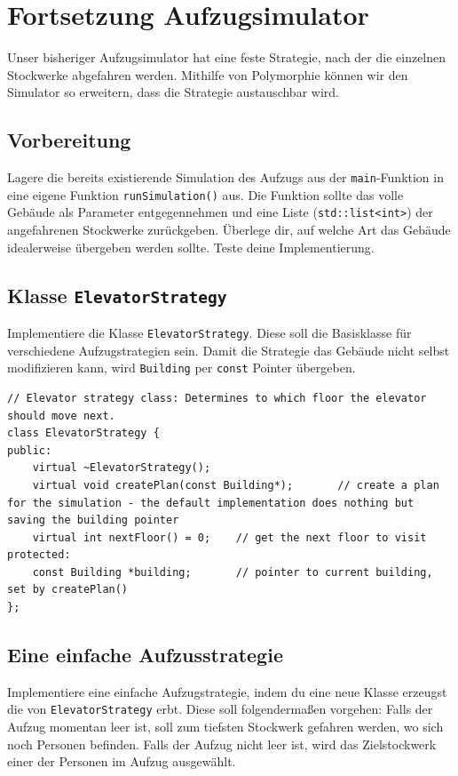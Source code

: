 \section{Fortsetzung Aufzugsimulator}
Unser bisheriger Aufzugsimulator hat eine feste Strategie, nach der die einzelnen Stockwerke abgefahren werden. Mithilfe von Polymorphie können wir den Simulator so erweitern, dass die Strategie austauschbar wird.  

\subsection{Vorbereitung}
Lagere die bereits existierende Simulation des Aufzugs aus der \texttt{main}-Funktion in eine eigene Funktion \texttt{runSimulation()} aus. Die Funktion sollte das volle Gebäude als Parameter entgegennehmen und eine Liste (\texttt{std::list<int>}) der angefahrenen Stockwerke zurückgeben. Überlege dir, auf welche Art das Gebäude idealerweise übergeben werden sollte.
Teste deine Implementierung.

\subsection{Klasse \texttt{ElevatorStrategy}}
Implementiere die Klasse \texttt{ElevatorStrategy}.
Diese soll die Basisklasse für verschiedene Aufzugstrategien sein.
Damit die Strategie das Gebäude nicht selbst modifizieren kann, wird \texttt{Building} per \texttt{const} Pointer übergeben.

\begin{lstlisting}
// Elevator strategy class: Determines to which floor the elevator should move next.
class ElevatorStrategy {
public:
	virtual ~ElevatorStrategy();
	virtual void createPlan(const Building*);		// create a plan for the simulation - the default implementation does nothing but saving the building pointer
	virtual int nextFloor() = 0;	// get the next floor to visit
protected:
	const Building *building;		// pointer to current building, set by createPlan()
};
\end{lstlisting}



\subsection{Eine einfache Aufzusstrategie}
Implementiere eine einfache Aufzugstrategie, indem du eine neue Klasse erzeugst die von \texttt{ElevatorStrategy} erbt.
Diese soll folgendermaßen vorgehen: 
Falls der Aufzug momentan leer ist, soll zum tiefsten Stockwerk gefahren werden, wo sich noch Personen befinden.
Falls der Aufzug nicht leer ist, wird das Zielstockwerk einer der Personen im Aufzug ausgewählt.

